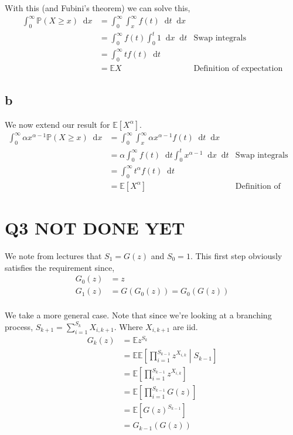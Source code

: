 \documentclass{article}
\newcommand{\diff}{\mathop{}\!\mathrm{d}}
\newcommand{\prob}{\mathbb{P}}
\newcommand{\expect}{\mathbb{E}}
\begin{document}
With this (and Fubini's theorem) we can solve this,
\begin{align*}
    \int_0^\infty \prob(X \geq x) \diff x
    &= \int_0^\infty \int_x^\infty f(t) \diff t \diff x \\
    &= \int_0^\infty f(t) \int_0^t 1 \diff x \diff t
    & \text{Swap integrals} \\
    &= \int_0^\infty t f(t) \diff t \\
    &= \expect X & \text{Definition of expectation}
\end{align*}

\subsection{b}
We now extend our result for $\expect\left[X^\alpha\right]$.
\begin{align*}
    \int_0^\infty \alpha x^{\alpha-1} \prob(X \geq x) \diff x
    &= \int_0^\infty \int_x^\infty \alpha x^{\alpha-1} f(t) \diff t \diff x \\
    &= \alpha \int_0^\infty f(t) \diff t \int_0^t x^{\alpha-1} \diff x \diff t
    & \text{Swap integrals} \\
    &= \int_0^\infty t^\alpha f(t) \diff t \\
    &= \expect \left[X^\alpha\right] & \text{Definition of expectation}
\end{align*}

\section{Q3 NOT DONE YET}
We note from lectures that $S_1 = G(z)$ and $S_0 = 1$. This first step
obviously satisfies the requirement since,
\begin{align*}
    G_0(z) &= z \\
    G_1(z) &= G(G_0(z)) = G_0(G(z)) \\
\end{align*}

We take a more general case. Note that since we're looking at a branching
process, $S_{k+1} = \sum_{i=1}^{S_k} X_{i,k+1}$. Where $X_{i,k+1}$ are iid.
\begin{align*}
    G_k(z) &= \expect z^{S_k} \\
    &= \expect \expect\left[ \prod_{i=1}^{S_{k-1}} z^{X_{i,k}} \middle| S_{k-1} \right] \\
    &= \expect \left[ \prod_{i=1}^{S_{k-1}} z^{X_{i,k}} \right] \\
    &= \expect \left[ \prod_{i=1}^{S_{k-1}} G(z) \right] \\
    &= \expect \left[ G{(z)}^{S_{k-1}} \right] \\
    &= G_{k-1}\left( G(z) \right) \\
\end{align*}
\end{document}
